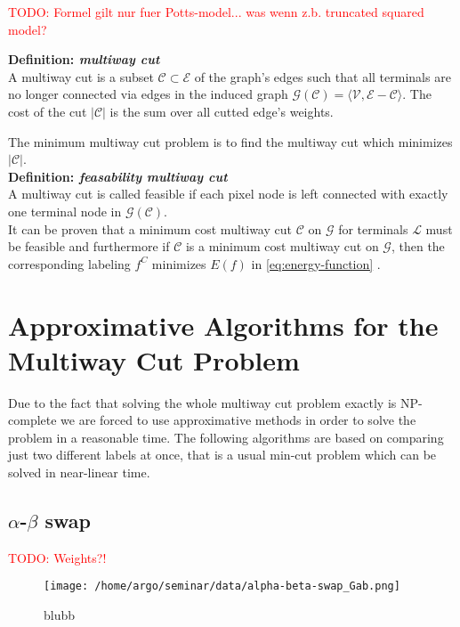 \documentclass{scrartcl}[12pt, halfparskip]
\newcommand{\todo}[1]{\textcolor{red}{TODO: #1}}
\begin{document}
\todo{Formel gilt nur fuer Potts-model... was wenn z.b. truncated squared model?}

\textbf{Definition: \textit{multiway cut}}\\
A multiway cut is a subset $\mathcal{C} \subset \mathcal{E}$ of the graph's edges such that all terminals are no longer connected via edges in the induced graph $\mathcal{G}(\mathcal{C}) = \langle \mathcal{V}, \mathcal{E} - \mathcal{C}\rangle$. The cost of the cut $|\mathcal{C}|$ is the sum over all cutted edge's weights. 

The minimum multiway cut problem is to find the multiway cut which minimizes $|\mathcal{C}|$. \\

\textbf{Definition: \textit{feasability multiway cut}}\\
A multiway cut is called feasible if each pixel node is left connected with exactly one terminal node in $\mathcal{G}(\mathcal{C})$. \\


It can be proven that a minimum cost multiway cut $\mathcal{C}$ on $\mathcal{G}$ for terminals $\mathcal{L}$ must be feasible \cite{boykov98} and furthermore if $\mathcal{C}$ is a minimum cost multiway cut on $\mathcal{G}$, then the corresponding labeling $f^C$ minimizes $E(f)$ in \eqref{eq:energy-function} \cite{boykov98}.





\section{Approximative Algorithms for the Multiway Cut Problem}
Due to the fact that solving the whole multiway cut problem exactly is NP-complete we are forced to use approximative methods in order to solve the problem in a reasonable time.
The following algorithms are based on comparing just two different labels at once, that is a usual min-cut problem which can be solved in near-linear time.


\subsection{$\alpha$-$\beta$ swap}

\todo{Weights?!}

\begin{wrapfigure}{r}{0.5\textwidth} 
	\vspace{-1.5cm}
	\texttt{[image: /home/argo/seminar/data/alpha-beta-swap\_Gab.png]}
	\caption{blubb}
	\label{fig:alpha-beta-swap_Gab}
\end{wrapfigure}
\end{document}
